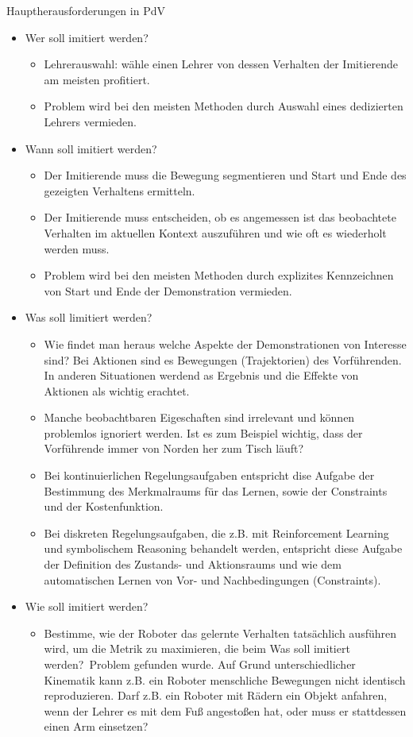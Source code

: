 \documentclass[paper=a4, fontsize=11pt]{scrartcl} %
\numberwithin{equation}{section} %
\numberwithin{figure}{section} %
\numberwithin{table}{section} %
\begin{document}
Hauptherausforderungen in PdV
\begin{itemize}
\item Wer soll imitiert werden?
\begin{itemize}
\item Lehrerauswahl: wähle einen Lehrer von dessen Verhalten der Imitierende am meisten profitiert.
\item Problem wird bei den meisten Methoden durch Auswahl eines dedizierten Lehrers vermieden.
\end{itemize}
\item Wann soll imitiert werden?
\begin{itemize}
\item Der Imitierende muss die Bewegung segmentieren und Start und Ende des gezeigten Verhaltens ermitteln.
\item Der Imitierende muss entscheiden, ob es angemessen ist das beobachtete Verhalten im aktuellen Kontext auszuführen und wie oft es wiederholt werden muss.
\item Problem wird bei den meisten Methoden durch explizites Kennzeichnen von Start und Ende der Demonstration vermieden.
\end{itemize}
\item Was soll limitiert werden?
\begin{itemize}
\item Wie findet man heraus welche Aspekte der Demonstrationen von Interesse sind? Bei Aktionen sind es Bewegungen (Trajektorien) des Vorführenden. In anderen Situationen werdend as Ergebnis und die Effekte von Aktionen als wichtig erachtet.
\item Manche beobachtbaren Eigeschaften sind irrelevant und können problemlos ignoriert werden. Ist es zum Beispiel wichtig, dass der Vorführende immer von Norden her zum Tisch läuft?
\item Bei kontinuierlichen Regelungsaufgaben entspricht dise Aufgabe der Bestimmung des Merkmalraums für das Lernen, sowie der Constraints und der Kostenfunktion.
\item Bei diskreten Regelungsaufgaben, die z.B. mit Reinforcement Learning und symbolischem Reasoning behandelt werden, entspricht diese Aufgabe der Definition des Zustands- und Aktionsraums und wie dem automatischen Lernen von Vor- und Nachbedingungen (Constraints).
\end{itemize}
\item Wie soll imitiert werden?
\begin{itemize}
\item Bestimme, wie der Roboter das gelernte Verhalten tatsächlich ausführen wird, um die Metrik zu maximieren, die beim \glqq Was soll imitiert werden?\grqq\ Problem gefunden wurde. Auf Grund unterschiedlicher Kinematik kann z.B. ein Roboter menschliche Bewegungen nicht identisch reproduzieren. Darf z.B. ein Roboter mit Rädern ein Objekt anfahren, wenn der Lehrer es mit dem Fuß angestoßen hat, oder muss er stattdessen einen Arm einsetzen?

\end{itemize}
\end{itemize}
\end{document}
